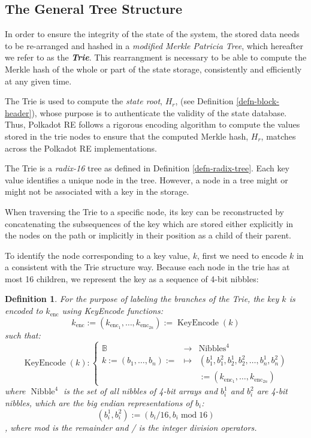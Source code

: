 \documentclass{book}
\newcommand{\assign}{:=}
\newcommand{\nosymbol}{}
\newcommand{\tmem}[1]{{\em #1\/}}
\newcommand{\tmop}[1]{\ensuremath{\operatorname{#1}}}
\newcommand{\tmstrong}[1]{\textbf{#1}}
\newtheorem{definition}{Definition}
\newtheorem{definition}{Definition}
\begin{document}
\subsection{The General Tree Structure}

In order to ensure the integrity of the state of the system, the stored data
needs to be re-arranged and hashed in a {\tmem{modified Merkle Patricia
Tree}}, which hereafter we refer to as the {\tmem{{\tmstrong{Trie}}}}. This
rearrangment is necessary to be able to compute the Merkle hash of the whole
or part of the state storage, consistently and efficiently at any given time.

The Trie is used to compute the {\tmem{state root}}, $H_r$, (see Definition
\ref{defn-block-header}), whose purpose is to authenticate the validity of the
state database. Thus, Polkadot RE follows a rigorous encoding algorithm to
compute the values stored in the trie nodes to ensure that the computed Merkle
hash, $H_r$, matches across the Polkadot RE implementations.

The Trie is a {\tmem{radix-16}} tree as defined in Definition
\ref{defn-radix-tree}. Each key value identifies a unique node in the tree.
However, a node in a tree might or might not be associated with a key in the
storage.

When traversing the Trie to a specific node, its key can be reconstructed by
concatenating the subsequences of the key which are stored either explicitly
in the nodes on the path or implicitly in their position as a child of their
parent.

To identify the node corresponding to a key value, $k$, first we need to
encode $k$ in a consistent with the Trie structure way. Because each node in
the trie has at most 16 children, we represent the key as a sequence of 4-bit
nibbles:

\begin{definition}
  For the purpose of labeling the branches of the Trie, the key $k$ is encoded
  to $k_{\tmop{enc}}$ using KeyEncode functions:
  \begin{equation}
    k_{\tmop{enc}} \assign (k_{\tmop{enc}_1}, \ldots, k_{\tmop{enc}_{2 n}})
    \assign \tmop{KeyEncode} (k) \label{key-encode-in-trie}
  \end{equation}
  such that:
  \[ \tmop{KeyEncode} (k) : \left\{ \begin{array}{lll}
       \mathbb{B}^{\nosymbol} & \rightarrow & \tmop{Nibbles}^4\\
       k \assign (b_1, \ldots, b_n) \assign & \mapsto & (b^1_1, b^2_1, b_2^1,
       b^2_2, \ldots, b^1_n, b^2_n)\\
       &  & \assign (k_{\tmop{enc}_1}, \ldots, k_{\tmop{enc}_{2 n}})
     \end{array} \right. \]
  where $\tmop{Nibble}^4$ is the set of all nibbles of 4-bit arrays and
  $b^1_i$ and $b^2_i$ are 4-bit nibbles, which are the big endian
  representations of $b_i$:
  \[ (b^1_i, b^2_i) \assign (b_i / 16, b_i \tmop{mod} 16) \]
  , where mod is the remainder and / is the integer division operators.
\end{definition}
\end{document}
